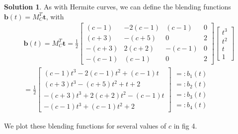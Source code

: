 \documentclass[10pt]{article}
\theoremstyle{plain}
\theoremstyle{definition}
\newtheorem*{soln*}{Solution}
\numberwithin{equation}{section}
\begin{document}
\begin{soln*}
    As with Hermite curves, we can define the blending functions
    $\bm{b}(t) = M_C^T \bm{t}$, with
    \begin{align*}
    \bm{b}(t) = M_C^T \bm{t}
              = 
            \frac{1}{2} \begin{bmatrix}
                (c-1)   & -2(c-1)   & (c-1)     & 0         \\
                (c+3)   & -(c+5)    & 0         & 2         \\
                -(c+3)  & 2(c+2)    & -(c-1)    & 0         \\
                -(c-1)  & (c-1)     & 0         & 2
            \end{bmatrix}
    \begin{bmatrix} t^3 \\ t^2 \\ t \\ 1 \end{bmatrix} \\
          =  \frac{1}{2} \begin{bmatrix}
              (c-1)   t^3 -2(c-1) t^2  + (c-1)  t \\ 
              (c+3)   t^3 -(c+5)  t^2    +     t   + 2         \\
              -(c+3)  t^3 + 2(c+2)  t^2  -(c-1) t  \\ 
              -(c-1)  t^3 + (c-1)   t^2  + 2
            \end{bmatrix}
            \begin{matrix}
                =: b_1(t) \\
                =: b_2(t) \\
                =: b_3(t) \\
                =: b_4(t) 
            \end{matrix}
    \end{align*}

We plot these blending functions for several values of $c$ in fig 4.
\end{soln*}
\hrulefill
\end{document}
